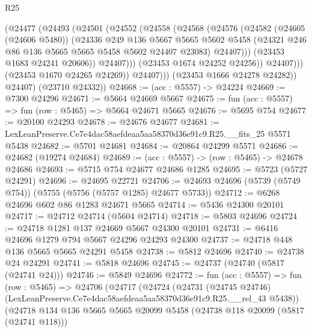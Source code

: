 \begin{lexlean}{R25}
\begin{coremodule}
                      (@24477
                        (@24493
                          (@24501
                            (@24552
                              (@24558
                                (@24568
                                  (@24576
                                    (@24582
                                      (@24605 (@24606 @5480))
                                      (@24336
                                        @249
                                        @136
                                        @5667
                                        @5665
                                        @5602
                                        @5458
                                        (@24321 @246 @86 @136 @5665 @5665 @5458 @5602 @24407 @23083)
                                        @24407)))
                                  (@23453 @1683 @24241 @20606))
                                @24407)))
                          (@23453 @1674 @24252 @24256))
                        @24407)))
                  (@23453 @1670 @24265 @24269))
                @24407)))
          (@23453 @1666 @24278 @24282))
        @24407)
      (@23710 @24332))
@24668 := (acc : @5557) -> @24224
@24669 := @7300 @24296
@24671 := @5664 @24669 @5667
@24675 := fun (acc : @5557) => fun (row : @5465) => @5664 @24671 @5665
@24676 := @5695 @754
@24677 := @20100 @24293
@24678 := @24676 @24677
@24681 := LexLeanPreserve.Ce7e4dac58aefdeaa5aa58370d36e91c9.R25.__fits_25 @5571 @5438
@24682 := @5701 @24681
@24684 := @20864 @24299 @5571
@24686 := @24682 (@19274 @24684)
@24689 := (acc : @5557) -> (row : @5465) -> @24678 @24686
@24693 := @5715 @754 @24677 @24686 @1285
@24695 := @5723 (@5727 @24291)
@24696 := @24695 @22721
@24706 := @24693 @24696 (@5739 (@5749 @754)) (@5755 (@5756 (@5757 @1285) @24677 @5733))
@24712 := @6268 @24696 @602 @86 @1283 @24671 @5665
@24714 := @5436 @24300 @20101
@24717 := @24712 @24714 (@5604 @24714)
@24718 := @5803 @24696
@24724 := @24718 @1281 @137 @24669 @5667 @24300 @20101
@24731 := @6416 @24696 @1279 @794 @5667 @24296 @24293 @24300
@24737 := @24718 @448 @136 @5665 @5665 @24291 @5458
@24738 := @5812 @24696
@24740 := @24738 @24 @24291
@24741 := @5818 @24696
@24745 := @24737 (@24740 (@5817 (@24741 @24)))
@24746 := @5849 @24696
@24772 := fun (acc : @5557) =>
  fun (row : @5465) =>
  @24706
    (@24717
      (@24724
        (@24731
          (@24745 @24746)
          (LexLeanPreserve.Ce7e4dac58aefdeaa5aa58370d36e91c9.R25.__rel_43 @5438))
        (@24718
          @134
          @136
          @5665
          @5665
          @20099
          @5458
          (@24738 @118 @20099 (@5817 (@24741 @118)))

\end{coremodule}
\end{lexlean}
